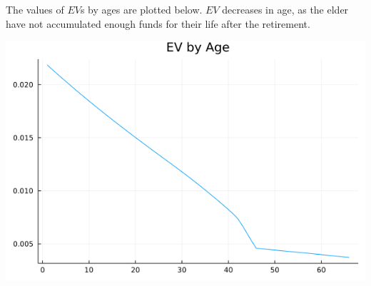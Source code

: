 \documentclass[11pt]{article} %
\begin{document}
\begin{itemize}
	The values of $EV$s by ages are plotted below. $EV$ decreases in age, as the elder have not accumulated enough funds for their life after the retirement.  
	
	\begin{center}
		\includegraphics[width=.5\linewidth]{./julia/EV.png}
	\end{center}
\end{itemize}

\pagebreak
\end{document}
